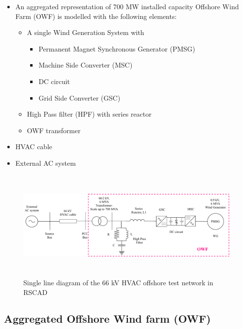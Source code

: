 \begin{itemize}
    \item An aggregated representation of 700 MW installed capacity Offshore Wind Farm (\gls{OWF}) is modelled with the following elements:
    \begin{itemize}
        \item A single Wind Generation System with 
    \begin{itemize}
        \item Permanent Magnet Synchronous Generator (\gls{PMSG})
        \item Machine Side Converter (\gls{MSC})
        \item \gls{DC} circuit
        \item Grid Side Converter (\gls{GSC}) 
    \end{itemize}
        \item High Pass filter (\gls{HPF}) with series reactor
        \item \gls{OWF} transformer
    \end{itemize}
    \item \gls{HVAC} cable  
     \item External \gls{AC} system
\end{itemize}

\begin{figure}[H]
\centering
    \includegraphics[height = 5.5cm,width = \textwidth]{Diagrams/Chapter_3/WT1_AC_RSCAD_OWF.pdf}
    \caption{Single line diagram of the 66 kV HVAC offshore test network in RSCAD}
    \label{fig:WT1_Model_RSCAD}
\end{figure}

\subsection{ Aggregated Offshore Wind farm (OWF)}\label{OWF}

